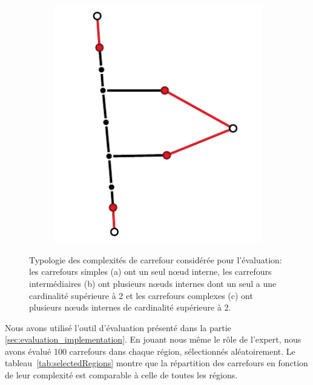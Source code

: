 \begin{figure}[ht]
\begin{subfigure}[t]{.25\linewidth}
        \caption{}
    \end{subfigure}
    \begin{subfigure}[t]{.25\linewidth}
        \centering
        \includegraphics[width=\linewidth]{images/evaluation/crseg/carrefour_complexe.pdf}
        \caption{}
    \end{subfigure}
    \caption[Typologie des complexités de carrefour]{Typologie des complexités de carrefour considérée pour l'évaluation: les carrefours simples (a) ont un seul nœud interne, les carrefours intermédiaires (b) ont plusieurs nœuds internes dont un seul a une cardinalité supérieure à 2 et les carrefours complexes (c) ont plusieurs nœuds internes de cardinalité supérieure à 2.}
    \label{fig:carrefours_simple_intermediaire_complexe}
\end{figure}

\newpar{}

Nous avons utilisé l'outil d'évaluation présenté dans la partie \ref{sec:evaluation_implementation}. En jouant nous même le rôle de l'expert, nous avons évalué 100 carrefours dans chaque région, sélectionnés aléatoirement. Le tableau~\ref{tab:selectedRegions} montre que la répartition des carrefours en fonction de leur complexité est comparable à celle de toutes les régions. 


